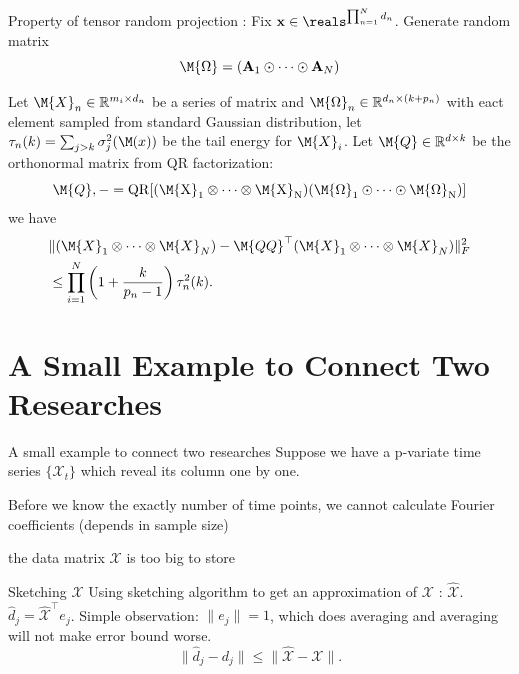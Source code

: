 \documentclass[handout,xcolor={usenames,dvipsnames}]{beamer}
\begin{document}
\begin{frame}{Property of tensor random projection}
:
Fix $\mathbf{x} \in \reals^{\prod_{n=1}^N d_n}$. Generate random matrix 
\[
\M{\Omega}= (\mathbf{A}_1 \odot \cdots \odot \mathbf{A}_N)
\]
\begin{thm}
	Let $\M{X}_n\in \mathbb{R}^{m_i\times d_n}$ be a series of matrix and $\M{\Omega}_n\in \mathbb{R}^{d_n\times (k+p_n)}$ with eact element sampled from standard Gaussian distribution, let  $\tau_n(k) = \sum_{j>k} \sigma^2_j(\M(x))$ be the tail energy for $\M{X}_i$. Let $\M{Q}\in \mathbb{R}^{d\times k}$ be the orthonormal matrix from QR factorization: 
	\[
	\M{Q}, - = \rm{QR} [(\M{X}_1\otimes \cdots \otimes \M{X}_N)(\M{\Omega}_1\odot \cdots \odot\M{\Omega}_N)]
	\]
	we have
	\begin{equation}
	\begin{aligned}
	&\| (\M{X}_1\otimes \cdots \otimes \M{X}_N) - \M{QQ}^\top(\M{X}_1\otimes \cdots \otimes \M{X}_N)\|^2_F \\
	& \le \prod_{i=1}^N  \left(1+\frac{k}{p_n-1}\right)\tau^2_n(k). 
	\end{aligned}
	\end{equation}
\end{thm}
\end{frame}



\section{A Small Example to Connect Two Researches}


\begin{frame}{A small example to connect two researches}
Suppose we have a p-variate time series $\{\mathcal{X}_t\}$ which reveal its column one by one. 

\bit 
\item Before we know the exactly number of time points, we cannot calculate Fourier coefficients (depends in sample size)
\item the data matrix $\mathcal{X}$ is too big to store 
\eit
\end{frame}


\begin{frame}{Sketching $\mathcal{X}$}
Using sketching algorithm  to get an approximation of $\mathcal{X}$ : $\hat{\mathcal{X}}$. 
$\hat{d}_j = \hat{\mathcal{X}}^\top e_j$.  Simple observation: $\|e_j\| = 1$, which does averaging and averaging will not make error bound worse. 
\[
\|\hat{d}_j - d_j\| \le \|\hat{\mathcal{X}} - \mathcal{X}\|. 
\]
\end{frame}








\end{document}
